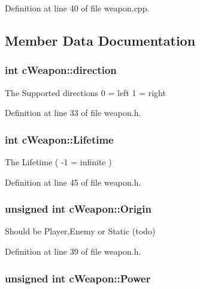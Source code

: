 Definition at line 40 of file weapon.\-cpp.



\subsection{Member Data Documentation}
\hypertarget{classc_weapon_a58de53c03a5be3817f6d5a03dac4b9fa}{
\subsubsection[{direction}]{\setlength{\rightskip}{0pt plus 5cm}int c\-Weapon\-::direction}}\label{classc_weapon_a58de53c03a5be3817f6d5a03dac4b9fa}
The Supported directions 0 = left 1 = right 

Definition at line 33 of file weapon.\-h.

\hypertarget{classc_weapon_a7bc9a58e30a80556ba83e32067657b74}{
\subsubsection[{Lifetime}]{\setlength{\rightskip}{0pt plus 5cm}int c\-Weapon\-::\-Lifetime}}\label{classc_weapon_a7bc9a58e30a80556ba83e32067657b74}


The Lifetime ( -\/1 = infinite ) 



Definition at line 45 of file weapon.\-h.

\hypertarget{classc_weapon_a2a521dd1a2aa10d5f6c0b45c09932519}{
\subsubsection[{Origin}]{\setlength{\rightskip}{0pt plus 5cm}unsigned int c\-Weapon\-::\-Origin}}\label{classc_weapon_a2a521dd1a2aa10d5f6c0b45c09932519}


Should be Player,Enemy or Static (todo) 



Definition at line 39 of file weapon.\-h.

\hypertarget{classc_weapon_aa33960894f9ca703e3b3ad6a9f7f3f67}{
\subsubsection[{Power}]{\setlength{\rightskip}{0pt plus 5cm}unsigned int c\-Weapon\-::\-Power}}\label{classc_weapon_aa33960894f9ca703e3b3ad6a9f7f3f67}



